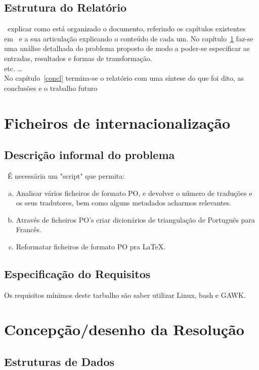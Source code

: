 \documentclass{report}
\begin{document}
\section*{Estrutura do Relatório} \
explicar como está organizado o documento, referindo os capítulos existentes em~\cite{Pereira201635}
e a sua articulação explicando o conteúdo de cada um.
No capítulo~\ref{fi} faz-se uma análise detalhada do problema proposto
de modo a poder-se especificar  as entradas, resultados e formas de transformação.\\
etc. \ldots\\
No capítulo~\ref{concl} termina-se o relatório com uma síntese do que foi dito,
as conclusões e o trabalho futuro

\chapter{Ficheiros de internacionalização} \label{fi}

\section{Descrição informal do problema}\
É necessária um "script" que permita:
\begin{enumerate}[a)]
\item Analisar vários ficheiros de formato PO, e devolver o número de traduções e os seus tradutores, bem como alguns metadados acharmos relevantes.
\item Através de ficheiros PO's criar dicionários de triangulação de Português para Francês.
\item Reformatar ficheiros de formato PO pra LaTeX.
\end{enumerate}

\section{Especificação do Requisitos}
Os requisitos mínimos deste tarbalho são saber utilizar Linux, bash e GAWK. 

\chapter{Concepção/desenho da Resolução}
\section{Estruturas de Dados}
\end{document}
